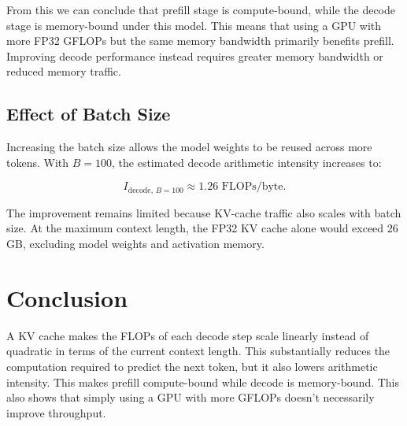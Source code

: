 \documentclass{article}
\begin{document}
From this we can conclude that prefill stage is compute-bound, while the decode stage is memory-bound under this model. This means that using a GPU with more FP32 GFLOPs but the same memory bandwidth primarily benefits prefill. Improving decode performance instead requires greater memory bandwidth or reduced memory traffic.

\subsection{Effect of Batch Size}

Increasing the batch size allows the model weights to be reused across more tokens. With $B=100$, the estimated decode arithmetic intensity increases to:

\begin{equation}
I_{\mathrm{decode},\,B=100} \approx 1.26 \text{ FLOPs/byte}.
\end{equation}

The improvement remains limited because KV-cache traffic also scales with batch size. At the maximum context length, the FP32 KV cache alone would exceed $26$ GB, excluding model weights and activation memory.

\section{Conclusion}

A KV cache makes the FLOPs of each decode step scale linearly instead of quadratic in terms of the current context length. This substantially reduces the computation required to predict the next token, but it also lowers arithmetic intensity. This makes prefill compute-bound while decode is memory-bound. This also shows that simply using a GPU with more GFLOPs doesn't necessarily improve throughput.
\end{document}
